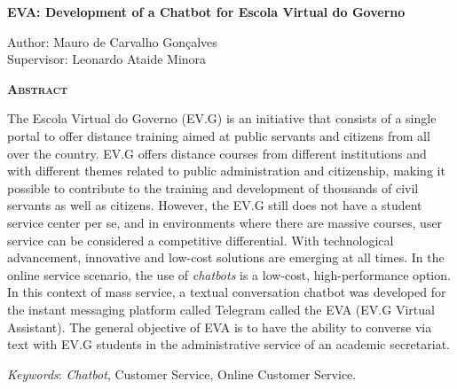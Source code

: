 \begin{center}
	{\Large{\textbf{EVA: Development of a Chatbot for Escola Virtual do Governo}}}
\end{center}

\vspace{1cm}

\begin{flushright}
	Author: Mauro de Carvalho Gonçalves\\
	Supervisor: Leonardo Ataide Minora
\end{flushright}

\vspace{1cm}

\begin{center}
	\Large{\textsc{\textbf{Abstract}}}
\end{center}

\noindent The Escola Virtual do Governo (EV.G) is an initiative that consists of a single portal to offer distance training aimed at public servants and citizens from all over the country.
EV.G offers distance courses from different institutions and with different themes related to public administration and citizenship, making it possible to contribute to the training and development of thousands of civil servants as well as citizens.
However, the EV.G still does not have a student service center per se, and in environments where there are massive courses, user service can be considered a competitive differential.
With technological advancement, innovative and low-cost solutions are emerging at all times. In the online service scenario, the use of \textit{chatbots} is a low-cost, high-performance option.
In this context of mass service, a textual conversation chatbot was developed for the instant messaging platform called Telegram called the EVA (EV.G Virtual Assistant). The general objective of EVA is to have the ability to converse via text with EV.G students in the administrative service of an academic secretariat.

\noindent\textit{Keywords}: \textit{Chatbot}, Customer Service, Online Customer Service.